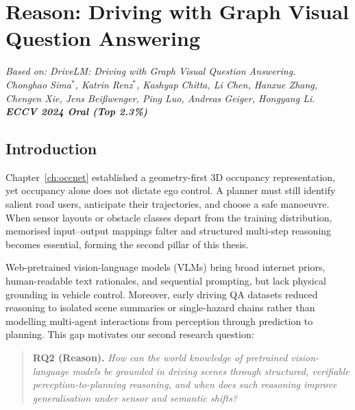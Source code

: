 \chapter{Reason: Driving with Graph Visual Question Answering}\label{ch:drivelm}
\begin{flushright}
\itshape
Based on: DriveLM: Driving with Graph Visual Question Answering.\\
Chonghao Sima$^{*}$, Katrin Renz$^{*}$, Kashyap Chitta, Li Chen, Hanxue Zhang,\\
Chengen Xie, Jens Bei{\ss}wenger, Ping Luo, Andreas Geiger, Hongyang Li.\\
\textbf{ECCV 2024 Oral (Top 2.3\%)} 
\end{flushright}
\vspace{0.6em}

\section{Introduction}\label{drivelm:sec:motivation}

Chapter~\ref{ch:occnet} established a geometry-first 3D occupancy representation, yet occupancy alone does not dictate ego control. A planner must still identify salient road users, anticipate their trajectories, and choose a safe manoeuvre. When sensor layouts or obstacle classes depart from the training distribution, memorised input--output mappings falter and structured multi-step reasoning becomes essential, forming the second pillar of this thesis.

Web-pretrained vision-language models (VLMs) bring broad internet priors, human-readable text rationales, and sequential prompting, but lack physical grounding in vehicle control. Moreover, early driving QA datasets reduced reasoning to isolated scene summaries or single-hazard chains rather than modelling multi-agent interactions from perception through prediction to planning. This gap motivates our second research question:
\begin{quote}
    \textbf{RQ2 (Reason).} \emph{How can the world knowledge of pretrained vision-language models be grounded in driving scenes through structured, verifiable perception-to-planning reasoning, and when does such reasoning improve generalisation under sensor and semantic shifts?}
\end{quote}

